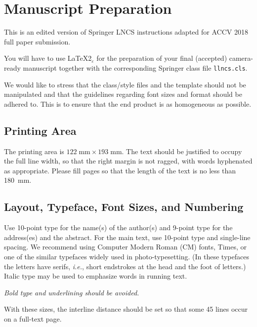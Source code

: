 \documentclass[runningheads]{llncs}
\begin{document}
\section{Manuscript Preparation}

This is an edited version of Springer LNCS instructions adapted for
ACCV 2018 full paper submission. 

You will have to use \LaTeX2$_\varepsilon$ for the
preparation of your final (accepted)
camera-ready manuscript together with the corresponding Springer
class file \verb+llncs.cls+.

We would like to stress that the class/style files and the template
should not be manipulated and that the guidelines regarding font sizes
and format should be adhered to. This is to ensure that the end product
is as homogeneous as possible.

\subsection{Printing Area}

The printing area is $122  \; \mbox{mm} \times 193 \;
\mbox{mm}$.
The text should be justified to occupy the full line width,
so that the right margin is not ragged, with words hyphenated as
appropriate. Please fill pages so that the length of the text
is no less than 180~mm.

\subsection{Layout, Typeface, Font Sizes, and Numbering}

Use 10-point type for the name(s) of the author(s) and 9-point type for
the address(es) and the abstract. For the main text, use 10-point
type and single-line spacing.
We recommend using Computer Modern Roman (CM) fonts, Times, or one
of the similar typefaces widely used in photo-typesetting.
(In these typefaces the letters have serifs, {\it i.e.}, short endstrokes at
the head and the foot of letters.)
Italic type may be used to emphasize words in running text. 

{\it Bold type and underlining should be avoided.}

With these sizes, the interline distance should be set so that some 45
lines occur on a full-text page.

\end{document}
